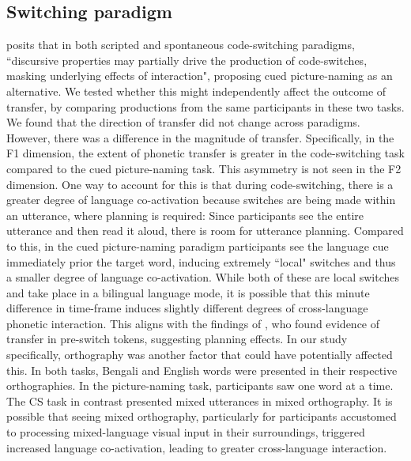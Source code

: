 \documentclass[12 pt]{article}
\begin{document}
\subsection{Switching paradigm}

\cite{olson2013bilingual} posits that in both scripted and spontaneous code-switching paradigms, ``discursive properties may partially drive the production of code-switches, masking underlying effects of interaction", proposing cued picture-naming as an alternative. We tested whether this might independently affect the outcome of transfer, by comparing productions from the same participants in these two tasks. We found that the direction of transfer did not change across paradigms. However, there was a difference in the magnitude of transfer. Specifically, in the F1 dimension, the extent of phonetic transfer is greater in the code-switching task compared to the cued picture-naming task. This asymmetry is not seen in the F2 dimension.
One way to account for this is that during code-switching, there is a greater degree of language co-activation because switches are being made within an utterance, where planning is required: Since participants see the entire utterance and then read it aloud, there is room for utterance planning. Compared to this, in the cued picture-naming paradigm participants see the language cue immediately prior the target word, inducing extremely ``local" switches and thus a smaller degree of language co-activation. While both of these are local switches and take place in a bilingual language mode, it is possible that this minute difference in time-frame induces slightly different degrees of cross-language phonetic interaction. This aligns with the findings of \cite{bullock2009trying}, who found evidence of transfer in pre-switch tokens, suggesting planning effects. In our study specifically, orthography was another factor that could have potentially affected this. In both tasks, Bengali and English words were presented in their respective orthographies. In the picture-naming task, participants saw one word at a time. The CS task in contrast presented mixed utterances in mixed orthography. It is possible that seeing mixed orthography, particularly for participants accustomed to processing mixed-language visual input in their surroundings, triggered increased language co-activation, leading to greater cross-language interaction.
\end{document}
